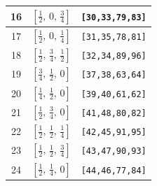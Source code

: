 \documentclass[fleqn,8pt]{jsarticle}
\begin{document}
\begin{longtable}{ccc}
16 & $\left[ \frac{1}{2},\, 0,\, \frac{3}{4} \right]$ & {\tt [30,33,79,83]} \\ \hline
17 & $\left[ \frac{1}{2},\, 0,\, \frac{1}{4} \right]$ & {\tt [31,35,78,81]} \\ \hline
18 & $\left[ \frac{1}{2},\, \frac{3}{4},\, \frac{1}{2} \right]$ & {\tt [32,34,89,96]} \\ \hline
19 & $\left[ \frac{3}{4},\, \frac{1}{2},\, 0 \right]$ & {\tt [37,38,63,64]} \\ \hline
20 & $\left[ \frac{1}{4},\, \frac{1}{2},\, 0 \right]$ & {\tt [39,40,61,62]} \\ \hline
21 & $\left[ \frac{1}{2},\, \frac{3}{4},\, 0 \right]$ & {\tt [41,48,80,82]} \\ \hline
22 & $\left[ \frac{1}{2},\, \frac{1}{2},\, \frac{1}{4} \right]$ & {\tt [42,45,91,95]} \\ \hline
23 & $\left[ \frac{1}{2},\, \frac{1}{2},\, \frac{3}{4} \right]$ & {\tt [43,47,90,93]} \\ \hline
24 & $\left[ \frac{1}{2},\, \frac{1}{4},\, 0 \right]$ & {\tt [44,46,77,84]} \\
\end{longtable}
\renewcommand{\arraystretch}{1.2}
\end{document}
